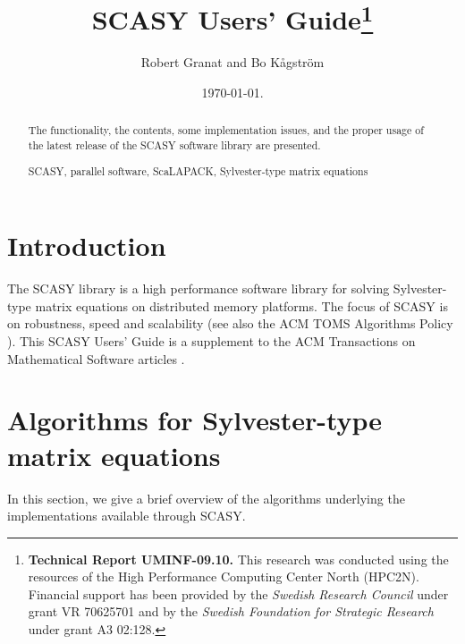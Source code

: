 \documentclass[11pt]{article}
\makeatletter
\def\s@btitle{\relax}
\def\subtitle#1{\gdef\s@btitle{#1}}
\makeatother
\begin{document}
\title{SCASY Users' Guide\thanks{
{\bf Technical Report UMINF-09.10.} This research was conducted using
the resources of the High Performance Computing Center North
(HPC2N). Financial support has been provided by the \emph{Swedish
Research Council} under grant VR 70625701  and by the
\emph{Swedish Foundation for Strategic Research} under grant A3
02:128. }}

\subtitle{Release 1.0}

\author{\renewcommand{\thefootnote}{\arabic{footnote}}
Robert Granat and Bo K{\aa}gstr{\"{o}}m\footnotemark[1]}


\date{\today.}
\maketitle

\begin{abstract}
\noindent The functionality, the contents, some implementation issues, and the
proper usage of the latest release of the SCASY software library are presented. 


\vspace{5mm}
%
 SCASY, parallel software, ScaLAPACK,
Sylvester-type matrix equations
\end{abstract}


\section{Introduction}
\label{sec:introduction} The SCASY library is a high performance
software library for solving Sylvester-type matrix equations on
distributed memory platforms. The focus of SCASY is on robustness,
speed and scalability (see also the ACM TOMS Algorithms Policy \cite{ACMAlgPolicy}). 
This SCASY Users' Guide is a supplement to the 
ACM Transactions on Mathematical Software articles 
\cite{granatkagstrom09a,granatkagstrom09b}.

\section{Algorithms for Sylvester-type matrix equations} \label{sec:algorithms}
In this section, we give a brief overview of the algorithms
underlying the implementations available through SCASY.
\end{document}
